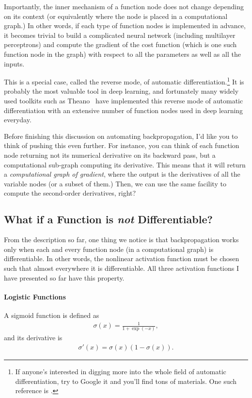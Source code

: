\documentclass{report}
\begin{document}
Importantly, the inner mechanism of a function node does not change depending on
its context (or equivalently where the node is placed in a computational graph.)
In other words, if each type of function nodes is implemented in advance, it
becomes trivial to build a complicated neural network (including multilayer
perceptrons) and compute the gradient of the cost function (which is one such
function node in the graph) with respect to all the parameters as well as all
the inputs.

This is a special case, called the reverse mode, of automatic
differentiation.\footnote{
    If anyone's interested in digging more into the whole field of automatic
    differentiation, try to Google it and you'll find tons of materials. One
    such reference is \cite{baydin2015automatic}.
} It is probably the most valuable tool in deep learning, and fortunately many
widely used toolkits such as Theano~\cite{bergstra2010theano,bastien2012theano}
have implemented this reverse mode of automatic differentiation with an
extensive number of function nodes used in deep learning everyday.

Before finishing this discussion on automating backpropagation, I'd like you to
think of pushing this even further. For instance, you can think of each function
node returning not its numerical derivative on its backward pass, but a
computational sub-graph computing its derivative. This means that it will return
a {\em computational graph of gradient}, where the output is the derivatives of
all the variable nodes (or a subset of them.) Then, we can use the same facility
to compute the second-order derivatives, right? 

\subsection{What if a Function is {\em not} Differentiable?}
\label{sec:nonlinearities}

From the description so far, one thing we notice is that backpropagation works
only when each and every function node (in a computational graph) is
differentiable. In other words, the nonlinear activation function must be chosen
such that almost everywhere it is differentiable. All three activation functions
I have presented so far have this property.

\paragraph{Logistic Functions}
A sigmoid function is defined as
\begin{align*}
    \sigma(x) = \frac{1}{1+\exp(-x)},
\end{align*}
and its derivative is
\begin{align*}
    \sigma'(x) = \sigma(x) (1 - \sigma(x)).
\end{align*}
\end{document}
